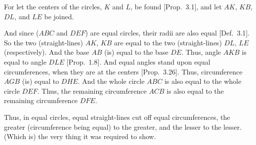 \begin{Parallel}{}{}
{\epsfysize=1.6in
\centerline{}

For let the centers of the circles, $K$ and $L$, be found [Prop.~3.1],
and let $AK$, $KB$, $DL$, and $LE$ be joined.

And since ($ABC$ and $DEF$) are equal circles, their radii are also equal [Def.~3.1]. So the two
(straight-lines) $AK$, $KB$ are equal to the two (straight-lines) $DL$, $LE$ (respectively).
And the base $AB$ (is) equal to the base $DE$. Thus, angle $AKB$ is equal
to angle $DLE$ [Prop.~1.8]. And equal angles stand upon equal circumferences,
when they are at the centers [Prop.~3.26]. Thus, circumference $AGB$
(is) equal to $DHE$. And the whole circle $ABC$ is also equal to the whole
circle $DEF$. Thus, the remaining circumference $ACB$
is also equal to the remaining circumference $DFE$.

Thus, in equal circles, equal straight-lines cut off equal circumferences, 
the greater (circumference being equal) to the greater, and the lesser to the lesser. (Which is) the very thing it was required to show.}
\end{Parallel}

